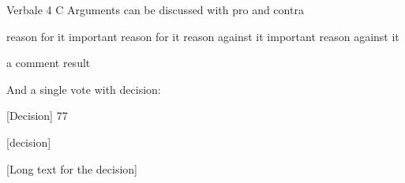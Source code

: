 \documentclass{report}
\begin{document}
\begin{Minutes}{Verbale 4 C}
Arguments can be discussed with pro and contra
\begin{Argumentation}
\pro reason for it
\Pro important reason for it
\contra reason against it
\Contra important reason against it
\item a comment
\result result
\end{Argumentation}


And a single vote with decision:\par
{}[Decision] 77
\begin{Vote}
[decision]
\end{Vote}

[Long text for the decision]
\end{Minutes}
\end{document}
